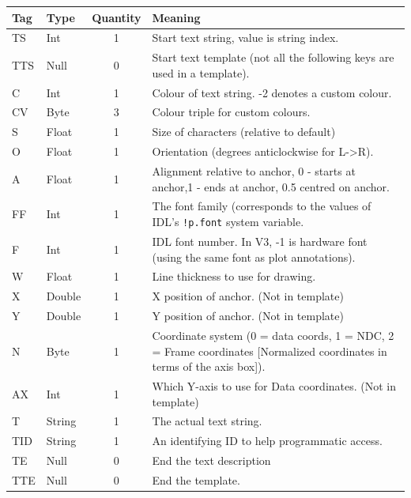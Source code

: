 \documentclass[english]{article}
\begin{document}
\begin{longtable}{|llcp{8cm}|}
\hline 
Tag&
Type&
Quantity&
Meaning\\
\hline
\endhead
\hline
\endfoot
TS& Int& 1&
Start text string, value is string index.\\
TTS& Null& 0&
Start text template (not all the following keys are used in a template).\\
\hline 
C& Int& 1&
Colour of text string. -2 denotes a custom colour.\\
CV & Byte & 3 &
Colour triple for custom colours.\\
S& Float& 1&
Size of characters (relative to default)\\
O& Float& 1&
Orientation (degrees anticlockwise for L->R).\\
A& Float& 1& Alignment relative to anchor, 0 - starts at anchor,1 -
ends at anchor,
0.5 centred on anchor.\\
FF & Int & 1 & The font family (corresponds to the values of IDL's
\texttt{!p.font} system variable.\\
F& Int& 1&
IDL font number. In V3, -1 is hardware font (using the same font as
plot annotations).\\
W& Float& 1&
Line thickness to use for drawing.\\
X& Double& 1&
X position of anchor. (Not in template)\\
Y& Double& 1&
Y position of anchor. (Not in template)\\
N& Byte& 1& Coordinate system (0 = data coords, 1 = NDC, 2 = Frame coordinates
[Normalized coordinates in terms of the axis box]).\\
AX & Int & 1 & Which Y-axis to use for Data coordinates. (Not in template)\\
T& String& 1&
The actual text string.\\
TID & String & 1 & An identifying ID to help programmatic access.\\
\hline TE& Null& 0&
End the text description\\
TTE& Null& 0&
End the template.\\
\end{longtable}
\end{document}
